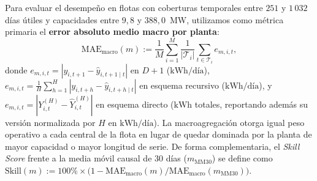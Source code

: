 Para evaluar el desempeño en flotas con coberturas temporales entre $251$ y $1\,032$ días útiles y capacidades entre $9{,}8$ y $388{,}0$~MW, utilizamos como métrica primaria el \textbf{error absoluto medio macro por planta}:
\begin{equation}
\mathrm{MAE}_{\mathrm{macro}}(m) := \frac{1}{M}\sum_{i=1}^{M}\frac{1}{|\mathcal{T}_i|}\sum_{t \in \mathcal{T}_i} e_{m,i,t},
\label{eq:mae_macro}
\end{equation}
donde $e_{m,i,t} = |y_{i,t+1} - \hat{y}_{i,t+1 \mid t}|$ en $D+1$ ($\text{kWh/día}$), $e_{m,i,t} = \frac{1}{H}\sum_{h=1}^{H}|y_{i,t+h} - \hat{y}_{i,t+h \mid t}|$ en esquema recursivo ($\text{kWh/día}$), y $e_{m,i,t} = |Y_{i,t}^{(H)} - \hat{Y}_{i,t}^{(H)}|$ en esquema directo ($\text{kWh}$ totales, reportando además su versión normalizada por $H$ en $\text{kWh/día}$). La macroagregación otorga igual peso operativo a cada central de la flota en lugar de quedar dominada por la planta de mayor capacidad o mayor longitud de serie. De forma complementaria, el \textit{Skill Score} frente a la media móvil causal de $30$ días ($m_{\mathrm{MM30}}$) se define como $\mathrm{Skill}(m) := 100\% \times \big(1 - \mathrm{MAE}_{\mathrm{macro}}(m)/\mathrm{MAE}_{\mathrm{macro}}(m_{\mathrm{MM30}})\big)$.
